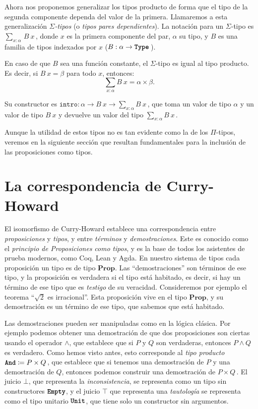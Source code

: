 \documentclass[
  a4paper, 
  10pt, 
  parskip=half, 
  toc=bibliography,
]{scrbook}
\theoremstyle{definition}
\theoremstyle{bolddef}
\newcommand{\funfont}[1]{\texttt{#1}}
\newcommand{\tyfont}[1]{\texttt{\textbf{#1}}}
\newcommand{\Prop}{\mathbf{Prop}}
\begin{document}
Ahora nos proponemos generalizar los tipos producto de forma que el tipo de
la segunda componente dependa del valor de la primera. Llamaremos a esta
generalización \emph{\(\Sigma\)-tipos} (o \emph{tipos pares dependientes}). La
notación para un \(\Sigma\)-tipo es \(\sum_{x: \alpha} \, B \ x \, \), donde \(x\) es 
la primera componente del par, \(\alpha\) su tipo, y \(B\) es una familia de
tipos indexados por \(x\) (\(B: \alpha \to \tyfont{Type}\,\)).

En caso de que \(B\) sea una función constante, el \(\Sigma\)-tipo es
igual al tipo producto. Es decir, si \(B \ x = \beta\) para todo \(x\), entonces:
\[
  \sum_{x: \alpha} B \ x = \alpha \times \beta.
\]

Su constructor es \(\funfont{intro}: \alpha \to B \ x \to \sum_{x: \alpha} B \ x \, \), que toma un
valor de tipo \(\alpha\) y un valor de tipo \(B \ x\) y devuelve un valor del
tipo \(\sum_{x: \alpha} B \ x \, \).

Aunque la utilidad de estos tipos no es tan evidente como la de los \(\Pi\)-tipos, 
veremos en la siguiente sección que resultan fundamentales para la inclusión de 
las proposiciones como tipos.

\section{La correspondencia de Curry-Howard}\label{sec:curry_howard}

El isomorfismo de Curry-Howard establece una correspondencia entre \emph{proposiciones}
y \emph{tipos}, y entre \emph{términos} y \emph{demostraciones}. Este es conocido como el
\emph{principio de Proposiciones como tipos}, y es la base de todos los
asistentes de prueba modernos, como Coq, Lean y Agda. En nuestro sistema de tipos
cada proposición un tipo es de tipo \(\Prop\). Las \enquote{demostraciones} son términos de
ese tipo, y la proposición es verdadera si el tipo está habitado, es decir, si
hay un término de ese tipo que es \emph{testigo} de su veracidad. 
Consideremos por ejemplo el teorema \enquote{\(\sqrt{2}\) es irracional}. 
Esta proposición vive en el tipo \(\Prop\), y su demostración es un
término de ese tipo, que sabemos que está habitado.

Las demostraciones pueden ser manipuladas como en la lógica clásica. Por ejemplo
podemos obtener una demostración de que dos proposiciones son ciertas usando el
operador \(\land\), que establece que si \(P\) y \(Q\) son verdaderas, entonces
\(P \land Q\) es verdadero. Como hemos visto antes, esto corresponde al \emph{tipo
producto} \(\tyfont{And} \coloneqq P \times Q\, \), que establece que si tenemos una 
demostración de \(P\) y una demostración de \(Q\), entonces podemos construir una
demostración de \(P \times Q\, \). El juicio \(\bot\), que representa la
\emph{inconsistencia}, se representa como un tipo sin constructores \(\tyfont{Empty}\), 
y el juicio \(\top\) que representa una \emph{tautología} se representa como el tipo unitario
\(\tyfont{Unit}\), que tiene solo un constructor sin argumentos.
\end{document}
